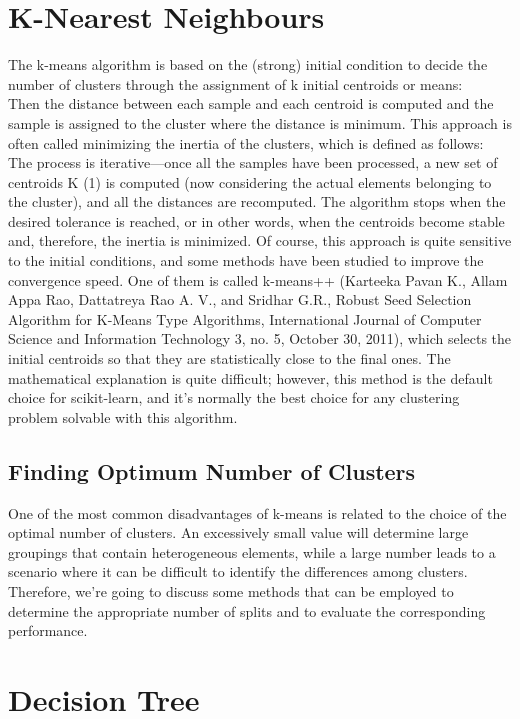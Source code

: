 \documentclass[12pt]{article}
\begin{document}
\section{K-Nearest Neighbours}
The k-means algorithm is based on the (strong) initial condition to decide the number of
clusters through the assignment of k initial centroids or means:
\\
Then the distance between each sample and each centroid is computed and the sample is
assigned to the cluster where the distance is minimum. This approach is often called
minimizing the inertia of the clusters, which is defined as follows:
\\
The process is iterative—once all the samples have been processed, a new set of centroids K (1) is computed (now considering the actual elements belonging to the cluster), and all the distances are recomputed. The algorithm stops when the desired tolerance is reached, or in other words, when the centroids become stable and, therefore, the inertia is minimized. Of course, this approach is quite sensitive to the initial conditions, and some methods have been studied to improve the convergence speed. One of them is called k-means++ (Karteeka Pavan K., Allam Appa Rao, Dattatreya Rao A. V., and Sridhar G.R., Robust Seed Selection Algorithm for K-Means Type Algorithms, International Journal of Computer Science and Information Technology 3, no. 5, October 30, 2011), which selects the initial centroids so that they are statistically close to the final ones. The mathematical explanation is quite difficult; however, this method is the default choice for scikit-learn, and it's normally the best choice for any clustering problem solvable with this algorithm.
\subsection{Finding Optimum Number of Clusters}
One of the most common disadvantages of k-means is related to the choice of the optimal number of clusters. An excessively small value will determine large groupings that contain heterogeneous elements, while a large number leads to a scenario where it can be difficult to identify the differences among clusters. Therefore, we're going to discuss some methods that can be employed to determine the appropriate number of splits and to evaluate the corresponding performance.

\newpage
\section{Decision Tree}
\end{document}
